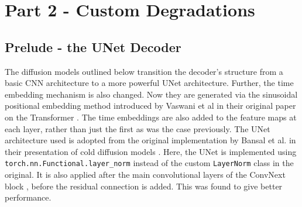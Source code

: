 \documentclass[11pt]{article}
\begin{document}
\section{Part 2 - Custom Degradations}
\subsection{Prelude - the UNet Decoder}
The diffusion models outlined below transition the decoder's structure from a basic CNN architecture to a more powerful UNet architecture. Further, the time embedding mechanism is also changed. Now they are generated via the sinusoidal positional embedding method introduced by Vaswani et al in their original paper on the Transformer \cite{vaswani2023attention}. The time embeddings are also added to the feature maps at each layer, rather than just the first as was the case previously.
The UNet architecture used is adopted from the original implementation by Bansal et al. in their presentation of cold diffusion models \cite{bansal2022cold}. Here, the UNet is implemented using \texttt{torch.nn.Functional.layer\_norm} instead of the custom \texttt{LayerNorm} class in the original. It is also applied after the main convolutional layers of the ConvNext block \cite{liu2022convnet}, before the residual connection is added. This was found to give better performance.
\end{document}
